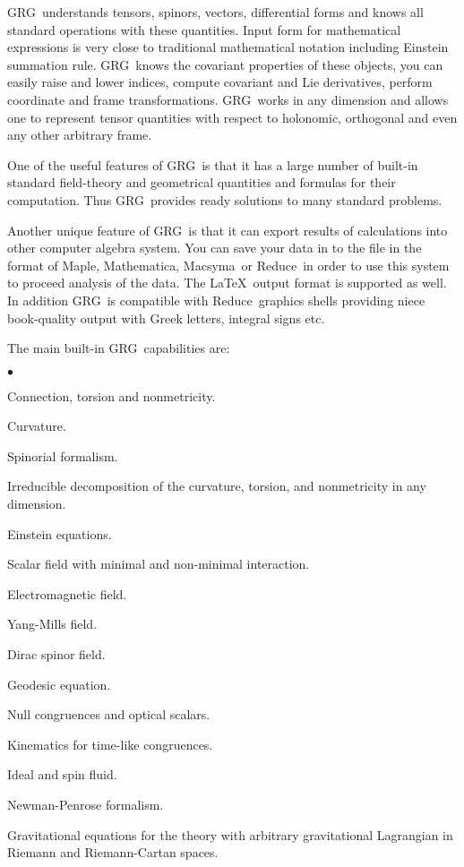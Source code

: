 \documentclass[twoside,openright]{report}
\newcommand{\grg}{{\sc GRG}}
\newcommand{\reduce}{{\sc Reduce}}
\newcommand{\maple}{{\sc Maple}}
\newcommand{\macsyma}{{\sc Macsyma}}
\newcommand{\mathematica}{{\sc Mathematica}}
\begin{document}
\grg\ understands tensors, spinors, vectors, differential forms
and knows all standard operations with these quantities.
Input form for mathematical expressions is very close
to traditional mathematical notation including Einstein summation
rule. \grg\ knows the covariant properties of
these objects, you can easily raise and lower indices,
compute covariant and Lie derivatives, perform
coordinate and frame transformations.
\grg\ works in any dimension and allows one to represent tensor
quantities with respect to holonomic, orthogonal and even
any other arbitrary frame.

One of the useful features of \grg\ is that it has a large
number of built-in standard field-theory
and geometrical quantities and formulas for their computation.
Thus \grg\ provides ready solutions to many standard problems.

Another unique feature of \grg\ is that it can export
results of calculations into other computer algebra system.
You can save your data in to the file in the format of
\maple, \mathematica, \macsyma\ or \reduce\ in order to use
this system to proceed analysis of the data.
The \LaTeX\ output format is supported as well.
In addition \grg\ is compatible with \reduce\ graphics
shells providing niece book-quality output with Greek letters,
integral signs etc.

The main built-in \grg\ capabilities are:
\begin{list}{$\bullet$}{\leftmargin=10mm}
\item  Connection, torsion and nonmetricity.
\item  Curvature.
\item  Spinorial formalism.
\item  Irreducible decomposition of the curvature, torsion, and
       nonmetricity in any dimension.
\item  Einstein equations.
\item  Scalar field with minimal and non-minimal interaction.
\item  Electromagnetic field.
\item  Yang-Mills field.
\item  Dirac spinor field.
\item  Geodesic equation.
\item  Null congruences and optical scalars.
\item  Kinematics for time-like congruences.
\item  Ideal and spin fluid.
\item  Newman-Penrose formalism.
\item  Gravitational equations for the theory with arbitrary
       gravitational Lagrangian in Riemann and Riemann-Cartan
       spaces.
\end{list}
\end{document}
